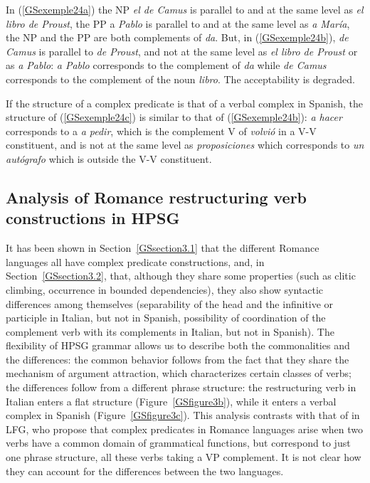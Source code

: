 \documentclass[output=paper
                ,modfonts
                ,nonflat
	        ,collection
	        ,collectionchapter
	        ,collectiontoclongg
 	        ,biblatex
                ,babelshorthands
                ,newtxmath
                ,draftmode
                ,colorlinks, citecolor=brown
]{./langsci/langscibook}
\begin{document}
{In (\ref{GSexemple24a}) the NP \emph{el de Camus} is parallel to and at the same level as \emph{el libro de Proust}, the PP a \emph{Pablo} is parallel to and at the same level as \emph{a Mar\'ia}, the NP and the PP are both complements of \emph{da}. But, in (\ref{GSexemple24b}), \emph{de Camus} is parallel to \emph{de Proust}, and not at the same level as \emph{el libro de Proust} or as \emph{a Pablo}: \emph{a Pablo} corresponds to the complement of \emph{da} while \emph{de Camus} corresponds to the complement of the noun \emph{libro}. The acceptability is degraded. 

If the structure of a complex predicate is that of a verbal complex in Spanish, the structure of (\ref{GSexemple24c}) is similar to that of (\ref{GSexemple24b}): \emph{a hacer} corresponds to a \emph{a pedir}, which is the complement V of \emph{volvi\'o} in a V-V constituent, and is not at the same level as \emph{proposiciones} which corresponds to \emph{un aut\'ografo} which is outside the V-V constituent.   

\subsection{Analysis of Romance restructuring verb constructions in HPSG} \label{GSsection3.3}
\label{sec-romance-complex-predicates}

It has been shown in Section~\ref{GSsection3.1} that the different Romance languages all have complex predicate constructions, and, in Section~\ref{GSsection3.2}, that, although they share some properties (such as clitic climbing, occurrence in bounded dependencies), they also show syntactic differences among themselves (separability of the head and the infinitive or participle in Italian, but not in Spanish, possibility of coordination of the complement verb with its complements in Italian, but not in Spanish). The flexibility of HPSG grammar allows us to describe both the commonalities and the differences: the common behavior follows from the fact that they share the mechanism of argument attraction, which characterizes certain classes of verbs; the differences follow from a different phrase structure: the restructuring verb in Italian enters a flat structure (Figure~\ref{GSfigure3b}), while it enters a verbal complex in Spanish (Figure~\ref{GSfigure3c}). This analysis contrasts with that of \cite{andrews1999complex} in LFG, who propose that complex predicates in Romance languages arise when two verbs have a common domain of grammatical functions, but correspond to just one phrase structure, all these verbs taking a VP complement. It is not clear how they can account for the differences between the two languages.

}
\end{document}
